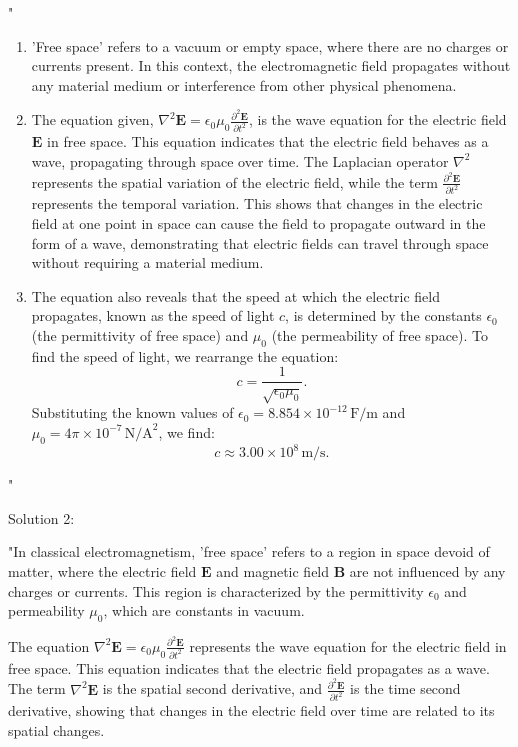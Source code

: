 "\begin{enumerate}
    \item 'Free space' refers to a vacuum or empty space, where there are no charges or currents present. In this context, the electromagnetic field propagates without any material medium or interference from other physical phenomena.
    
    \item The equation given, $\nabla^2 \mathbf{E} = \epsilon_0 \mu_0 \frac{\partial^2 \mathbf{E}}{\partial t^2}$, is the wave equation for the electric field $\mathbf{E}$ in free space. This equation indicates that the electric field behaves as a wave, propagating through space over time. The Laplacian operator $\nabla^2$ represents the spatial variation of the electric field, while the term $\frac{\partial^2 \mathbf{E}}{\partial t^2}$ represents the temporal variation. This shows that changes in the electric field at one point in space can cause the field to propagate outward in the form of a wave, demonstrating that electric fields can travel through space without requiring a material medium.

    \item The equation also reveals that the speed at which the electric field propagates, known as the speed of light $c$, is determined by the constants $\epsilon_0$ (the permittivity of free space) and $\mu_0$ (the permeability of free space). To find the speed of light, we rearrange the equation:
    \[
    c = \frac{1}{\sqrt{\epsilon_0 \mu_0}}.
    \]
    Substituting the known values of $\epsilon_0 = 8.854 \times 10^{-12} \, \text{F/m}$ and $\mu_0 = 4\pi \times 10^{-7} \, \text{N/A}^2$, we find:
    \[
    c \approx 3.00 \times 10^8 \, \text{m/s}.
    \]
\end{enumerate}"

Solution 2:

"In classical electromagnetism, 'free space' refers to a region in space devoid of matter, where the electric field $\mathbf{E}$ and magnetic field $\mathbf{B}$ are not influenced by any charges or currents. This region is characterized by the permittivity $\epsilon_0$ and permeability $\mu_0$, which are constants in vacuum.

The equation $\nabla^2 \mathbf{E} = \epsilon_0 \mu_0 \frac{\partial^2 \mathbf{E}}{\partial t^2}$ represents the wave equation for the electric field in free space. This equation indicates that the electric field propagates as a wave. The term $\nabla^2 \mathbf{E}$ is the spatial second derivative, and $\frac{\partial^2 \mathbf{E}}{\partial t^2}$ is the time second derivative, showing that changes in the electric field over time are related to its spatial changes.

